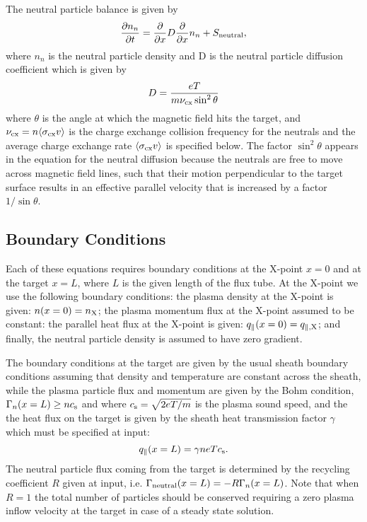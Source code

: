 \documentclass[amsmath,amssymb,a4]{revtex4-2}
\begin{document}
\noindent The neutral particle balance is given by
\begin{equation}\label{neutral_particle_balance}
    {\partial n_n \over \partial t} = {\partial \over \partial x} D {\partial \over \partial x} n_n + S_{\rm neutral},
\end{equation}
where $n_n$ is the neutral particle density and D is the neutral particle diffusion coefficient which is given by \cite{nakazawa2000}
\begin{equation}\label{neutral_diffusion_coefficient}
    D = { eT \over m \nu_{\rm cx} \sin^2\theta }
\end{equation}
where $\theta$ is the angle at which the magnetic field hits the target, and $\nu_{\rm cx} = n \langle\sigma_{\rm cx} v\rangle$ is the charge exchange collision frequency for the neutrals and the average charge exchange rate $\langle\sigma_{\rm cx} v\rangle$ is specified below. The factor $\sin^2\theta$ appears in the equation for the neutral diffusion because the neutrals are free to move across magnetic field lines, such that their motion perpendicular to the target surface results in an effective parallel velocity that is increased by a factor $1/\sin\theta$.


\subsection{Boundary Conditions}

Each of these equations requires boundary conditions at the X-point $x=0$ and at the target $x=L$, where $L$ is the given length of the flux tube. At the X-point we use the following boundary conditions:
the plasma density at the X-point is given: $n(x=0) = n_{\rm X}$; the plasma momentum flux at the X-point assumed to be constant: the parallel heat flux at the X-point is given:  $q_\parallel(x=0) = q_{\parallel,\rm X}$; and finally, the neutral particle density is assumed to have zero gradient.

The boundary conditions at the target are given by the usual sheath boundary conditions assuming that density and temperature are constant across the sheath, while the plasma particle flux and momentum are given by the Bohm condition, $\Gamma_n(x=L) \ge n c_{\rm s}$ and  where $c_{\rm s} = \sqrt{2eT/m}$ is the plasma sound speed, and the the heat flux on the target is given by the sheath heat transmission factor $\gamma$ which must be specified at input:
\begin{equation}\label{sheath_heat_transmission}
    q_\parallel(x=L) = \gamma n e T c_{\rm s}.
\end{equation}
The neutral particle flux coming from the target is determined by the recycling coefficient $R$ given at input, i.e. $\Gamma_{\rm neutral}(x=L) = - R \Gamma_n(x=L)$. Note that when $R=1$ the total number of particles should be conserved requiring a zero plasma inflow velocity at the target in case of a steady state solution.
\end{document}
